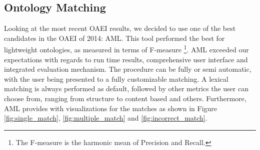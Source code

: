 \documentclass[runningheads,a4paper]{../../StyleFiles/llncs}
\begin{document}
\subsection{Ontology Matching}
\label{Ontology_Matching}
Looking at the most recent OAEI results, we decided to use one of the best candidates in the OAEI of 2014: AML. This tool performed the best for lightweight ontologies, as measured in terms of F-measure \footnote{The F-measure is the harmonic mean of Precision and Recall.}. AML exceeded our expectations with regards to run time results, comprehensive user interface and integrated evaluation mechanism. The procedure can be fully or semi automatic, with the user being presented to a fully customizable matching. A lexical matching is always performed as default, followed by other metrics the user can choose from, ranging from structure to content based and others. Furthermore, AML provides with visualizations for the matches as shown in Figure \ref{fig:single_match}, \ref{fig:multiple_match} and \ref{fig:incorrect_match}.
\end{document}
